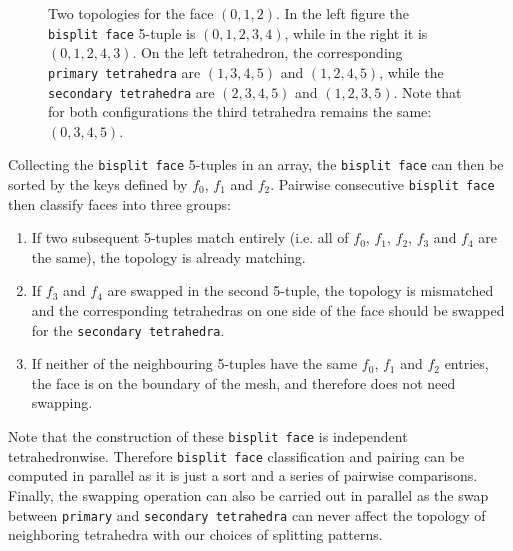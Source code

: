 \documentclass{article}
\begin{document}
	\begin{figure}[h]
		\begin{subfigure}{0.5\textwidth}
			\centering
			
		\end{subfigure}
		\begin{subfigure}{0.5\textwidth}
			\centering
			
		\end{subfigure}
		\caption{Two topologies for the face $(0, 1, 2)$. In the left figure the \texttt{bisplit~face} 5-tuple is $(0, 1, 2, 3, 4)$, while in the right it is $(0, 1, 2, 4, 3)$. On the left tetrahedron, the corresponding \texttt{primary~tetrahedra} are $(1, 3, 4, 5)$ and $(1, 2, 4, 5)$, while the \texttt{secondary~tetrahedra} are $(2, 3, 4, 5)$ and $(1, 2, 3, 5)$. Note that for both configurations the third tetrahedra remains the same: $(0, 3, 4, 5)$.}
	\end{figure}

	Collecting the \texttt{bisplit~face} 5-tuples in an array, the \texttt{bisplit~face} can then be sorted by the keys defined by $f_0$, $f_1$ and $f_2$. Pairwise consecutive \texttt{bisplit~face} then classify faces into three groups:
	\begin{enumerate}[label=\textbf{\arabic*.}, ref=\arabic*, itemsep=0em, parsep=0em]
		\item If two subsequent 5-tuples match entirely (i.e. all of $f_0$, $f_1$, $f_2$, $f_3$ and $f_4$ are the same), the topology is already matching.
		\item If $f_3$ and $f_4$ are swapped in the second 5-tuple, the topology is mismatched and the corresponding tetrahedras on one side of the face should be swapped for the \texttt{secondary~tetrahedra}.
		\item If neither of the neighbouring 5-tuples have the same $f_0$, $f_1$ and $f_2$ entries, the face is on the boundary of the mesh, and therefore does not need swapping.
	\end{enumerate}
	\vspace{1cm}

	Note that the construction of these \texttt{bisplit~face} is independent tetrahedronwise. Therefore \texttt{bisplit~face} classification and pairing can be computed in parallel as it is just a sort and a series of pairwise comparisons. Finally, the swapping operation can also be carried out in parallel as the swap between \texttt{primary} and \texttt{secondary~tetrahedra} can never affect the topology of neighboring tetrahedra with our choices of splitting patterns.
\end{document}
